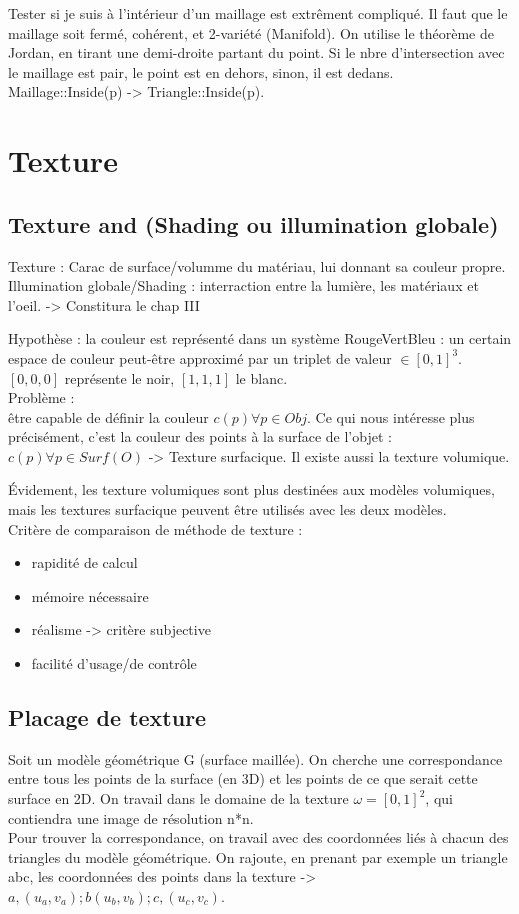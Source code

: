 \documentclass[11pt]{article}
\begin{document}
Tester si je suis à l'intérieur d'un maillage est extrêment compliqué. Il faut que le maillage soit fermé, cohérent, et 2-variété (Manifold). On utilise le théorème de Jordan, en tirant une demi-droite partant du point. Si le nbre d'intersection avec le maillage est pair, le point est en dehors, sinon, il est dedans. Maillage::Inside(p) -> Triangle::Inside(p).

\newpage
\section{Texture}
\subsection{Texture and (Shading ou illumination globale)}

Texture : Carac de surface/volumme du matériau, lui donnant sa couleur propre.\\
Illumination globale/Shading : interraction entre la lumière, les matériaux et l'oeil. -> Constitura le chap III

Hypothèse : la couleur est représenté dans un système RougeVertBleu : un certain espace de couleur peut-être approximé par un triplet de valeur $ \in[0, 1]^3$. $[0, 0, 0]$ représente le noir, $[1, 1, 1]$ le blanc.\\

Problème : \\
être capable de définir la couleur $c(p) \forall p \in Obj$. Ce qui nous intéresse plus précisément, c'est la couleur des points à la surface de l'objet : $c(p) \forall p \in Surf(O)$ -> Texture surfacique. Il existe aussi la texture volumique.

Évidement, les texture volumiques sont plus destinées aux modèles volumiques,  mais les textures surfacique peuvent être utilisés avec les deux modèles.\\

Critère de comparaison de méthode de texture : \\
\begin{itemize}
	\item rapidité de calcul
	\item mémoire nécessaire
	\item réalisme -> critère subjective
	\item facilité d'usage/de contrôle
\end{itemize}

\vskip 2cm
\subsection{Placage de texture}
Soit un modèle géométrique G (surface maillée). On cherche une correspondance entre tous les points de la surface (en 3D) et les points de ce que serait cette surface en 2D. On travail dans le domaine de la texture $\omega = [0, 1]^2$, qui contiendra une image de résolution n*n.\\
Pour trouver la correspondance, on travail avec des coordonnées liés à chacun des triangles du modèle géométrique. On rajoute, en prenant par exemple un triangle abc, les coordonnées des points dans la texture -> $a, (u_a, v_a); b(u_b, v_b); c, (u_c, v_c)$.\\
\end{document}
